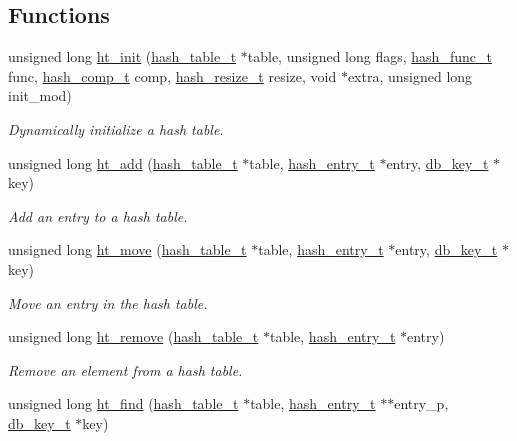 \subsection*{Functions}
\begin{CompactItemize}
\item 
unsigned long \hyperlink{group__dbprim__hash_a6}{ht\_\-init} (\hyperlink{group__dbprim__hash_a0}{hash\_\-table\_\-t} $\ast$table, unsigned long flags, \hyperlink{group__dbprim__hash_a3}{hash\_\-func\_\-t} func, \hyperlink{group__dbprim__hash_a4}{hash\_\-comp\_\-t} comp, \hyperlink{group__dbprim__hash_a5}{hash\_\-resize\_\-t} resize, void $\ast$extra, unsigned long init\_\-mod)
\begin{CompactList}\small\item\em Dynamically initialize a hash table.\item\end{CompactList}\item 
unsigned long \hyperlink{group__dbprim__hash_a7}{ht\_\-add} (\hyperlink{group__dbprim__hash_a0}{hash\_\-table\_\-t} $\ast$table, \hyperlink{group__dbprim__hash_a1}{hash\_\-entry\_\-t} $\ast$entry, \hyperlink{group__dbprim_a0}{db\_\-key\_\-t} $\ast$key)
\begin{CompactList}\small\item\em Add an entry to a hash table.\item\end{CompactList}\item 
unsigned long \hyperlink{group__dbprim__hash_a8}{ht\_\-move} (\hyperlink{group__dbprim__hash_a0}{hash\_\-table\_\-t} $\ast$table, \hyperlink{group__dbprim__hash_a1}{hash\_\-entry\_\-t} $\ast$entry, \hyperlink{group__dbprim_a0}{db\_\-key\_\-t} $\ast$key)
\begin{CompactList}\small\item\em Move an entry in the hash table.\item\end{CompactList}\item 
unsigned long \hyperlink{group__dbprim__hash_a9}{ht\_\-remove} (\hyperlink{group__dbprim__hash_a0}{hash\_\-table\_\-t} $\ast$table, \hyperlink{group__dbprim__hash_a1}{hash\_\-entry\_\-t} $\ast$entry)
\begin{CompactList}\small\item\em Remove an element from a hash table.\item\end{CompactList}\item 
unsigned long \hyperlink{group__dbprim__hash_a10}{ht\_\-find} (\hyperlink{group__dbprim__hash_a0}{hash\_\-table\_\-t} $\ast$table, \hyperlink{group__dbprim__hash_a1}{hash\_\-entry\_\-t} $\ast$$\ast$entry\_\-p, \hyperlink{group__dbprim_a0}{db\_\-key\_\-t} $\ast$key)
$$
\end{CompactItemize}
